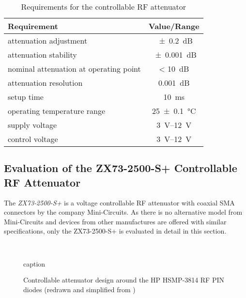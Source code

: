\begin{table}[tbh]
\caption{Requirements for the controllable RF attenuator}
\label{tab:interfacingFlute_rfattenrequirements}
\centering
\begin{tabular}{lc}
\toprule
Requirement & {Value/Range}\\
\midrule
attenuation adjustment & \SI{\pm0.2}{\dB}\\
attenuation stability & \SI{\pm0.001}{\dB}\\
nominal attenuation at operating point & < \SI{10}{\dB}\\
attenuation resolution & \SI{0.001}{\dB}\\
setup time & \SI{10}{\milli\second}\\
operating temperature range & \SI{25\pm0.1}{\celsius}\\
supply voltage & \SIrange{3}{12}{\volt}\\
control voltage & \SIrange{3}{12}{\volt}\\
\bottomrule
\end{tabular}
\end{table}

\subsection{Evaluation of the ZX73-2500-S+ Controllable RF Attenuator}
The \textit{ZX73-2500-S+} is a voltage controllable RF attenuator with coaxial SMA connectors by the company Mini-Circuits. As there is no alternative model from Mini-Circuits and devices from other manufactures are offered with similar specifications, only the ZX73-2500-S+ is evaluated in detail in this section.



\begin{figure}[tb]
    \centering
		\\
		\caption{caption}
    \label{fig:attenPhotoAndEquiC}
\end{figure}

\begin{figure}[tb]
    \centering
	
	\caption{Controllable attenuator design around the HP HSMP-3814 RF PIN diodes (redrawn and simplified from \cite{waughLowCostSurfaceMount1992})}
    \label{fig:quadPiequiC}
\end{figure}




